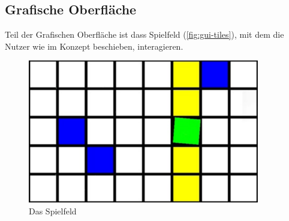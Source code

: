 \subsection{Grafische Oberfläche}

Teil der Grafischen Oberfläche ist dass Spielfeld (\autoref{fig:gui-tiles}), mit dem die Nutzer wie im Konzept beschieben, interagieren.

\begin{figure}[htbp] 
  \centering
     \includegraphics[width=0.9\textwidth]{images/gui-tiles}
  \caption{Das Spielfeld}
  \label{fig:gui-tiles}
\end{figure}